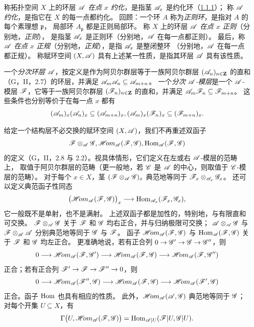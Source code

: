称拓扑空间 $X$ 上的环层 $\A$ \emph{在点 $x$ 约化}，是指茎 $\A_x$ 是约化环（\hyperlink{para:0:1.1.1}{1.1.1}）；
称 $\A$ \emph{约化}，是指它在 $X$ 的每一点都约化。
回顾：一个环 $A$ 称为\emph{正则环}，是指对 $A$ 的每个素理想 $\mathfrak p$，
局部环 $A_{\mathfrak p}$ 都是正则局部环。
称 $X$ 上的环层 $\A$ \emph{在点 $x$ 正则}（分别地，\emph{正则}），
是指茎 $\A_x$ 是正则环（分别地，$\A$ 在每一点都正则）。
最后，称 $\A$ \emph{在点 $x$ 正规}（分别地，\emph{正规}），是指 $\A_x$ 是整闭整环
（分别地，$\A$ 在每一点都正规）。
称赋环空间 $(X,\A)$ 具有上述某一性质，是指其环层 $\A$ 具有该性质。

一个\emph{分次环层} $\A$，按定义是作为阿贝尔群层等于一族阿贝尔群层
$(\A_n)_{n\in\mathbf Z}$ 的直和（G，II，2.7）的环层，并满足
$\A_m\A_n\subseteq\A_{m+n}$。
一个\emph{分次 $\A$-模层}是一个 $\A$-模层 $\F$，它等于一族阿贝尔群层
$(\F_n)_{n\in\mathbf Z}$ 的直和，并满足 $\A_m\F_n\subseteq\F_{m+n}$。
这些条件也分别等价于在每一点 $x$ 都有
\[
 (\A_m)_x(\A_n)_x\subseteq(\A_{m+n})_x,
 \qquad
 (\A_m)_x(\F_n)_x\subseteq(\F_{m+n})_x.
\]

给定一个结构层不必交换的赋环空间 $(X,\A)$，我们不再重述双函子
\[
 \F\otimes_{\A}\G,\qquad
 \shHom_{\A}(\F,\G),\qquad
 \Hom_{\A}(\F,\G)
\]
的定义（G，II，2.8 与 2.2）。视具体情形，它们定义在左或右 $\A$-模层的范畴上，
取值于阿贝尔群层的范畴（更一般地，若 $\C$ 是 $\A$ 的中心，则取值于 $\C$-模层的范畴）。
对于每个 $x\in X$，茎 $(\F\otimes_{\A}\G)_x$ 典范地等同于
$\F_x\otimes_{\A_x}\G_x$。
还可以定义典范函子性同态
\[
 \bigl(\shHom_{\A}(\F,\G)\bigr)_x
 \longrightarrow\Hom_{\A_x}(\F_x,\G_x),
\]
它一般既不是单射，也不是满射。
上述双函子都是加性的，特别地，与有限直和可交换。
$\F\otimes_{\A}\G$ 关于 $\F$ 和 $\G$ 均右正合，并与归纳极限可交换；
$\A\otimes_{\A}\G$ 与 $\F\otimes_{\A}\A$ 分别典范地等同于 $\G$ 与 $\F$。
函子 $\shHom_{\A}(\F,\G)$ 与 $\Hom_{\A}(\F,\G)$ 关于 $\F$ 和 $\G$ 均左正合。
更准确地说，若有正合列 $0\to\G'\to\G\to\G''$，则
\[
 0\longrightarrow\shHom_{\A}(\F,\G')
 \longrightarrow\shHom_{\A}(\F,\G)
 \longrightarrow\shHom_{\A}(\F,\G'')
\]
正合；若有正合列 $\F'\to\F\to\F''\to0$，则
\[
 0\longrightarrow\shHom_{\A}(\F'',\G)
 \longrightarrow\shHom_{\A}(\F,\G)
 \longrightarrow\shHom_{\A}(\F',\G)
\]
正合。函子 $\Hom$ 也具有相应的性质。
此外，$\shHom_{\A}(\A,\G)$ 典范地等同于 $\G$；对每个开集 $U\subseteq X$，有
\[
 \Gamma\bigl(U,\shHom_{\A}(\F,\G)\bigr)
 =\Hom_{\A|U}(\F|U,\G|U).
\]

